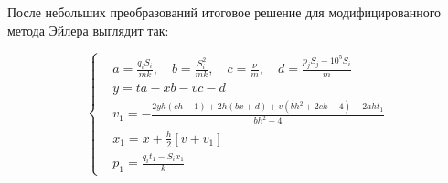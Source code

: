 \documentclass[12pt, a4paper]{article}
\begin{document}
После небольших преобразований итоговое решение для модифицированного метода Эйлера выглядит так:

$$\left\{\begin{aligned}
&a = \frac{q_i S_i}{m k},\quad b = \frac{S_i^2}{m k},\quad c = \frac{\nu}{m},\quad d = \frac{p_j S_j-10^5 S_i}{m} \\
&y = t a - x b - v c - d \\
&v_1 = -\frac{2 y h(c h - 1) + 2 h(b x + d) + v(b h^2 + 2 c h - 4) - 2 a h t_1}{b h^2 + 4} \\
&x_1 = x + \frac{h}{2}\left[v + v_1\right] \\
&p_1 = \frac{q_i t_1 - S_i x_1}{k}
\end{aligned}\right.$$
\end{document}
